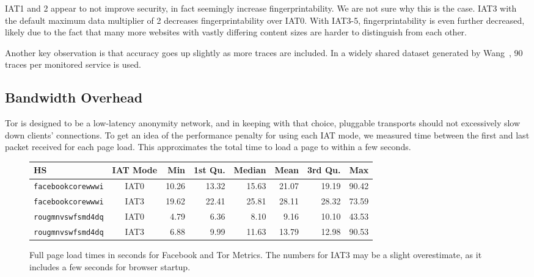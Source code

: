 \documentclass[11pt]{article}
\begin{document}
IAT1 and 2 appear to not improve security, in fact seemingly increase fingerprintability. We are not sure why this is the case. IAT3 with the default maximum data multiplier of 2 decreases fingerprintability over IAT0. With IAT3-5, fingerprintability is even further decreased, likely due to the fact that many more websites with vastly differing content sizes are harder to distinguish from each other.

Another key observation is that accuracy goes up slightly as more traces are included. In a widely shared dataset generated by Wang~\cite{wang}, 90 traces per monitored service is used.

\subsection{Bandwidth Overhead}
Tor is designed to be a low-latency anonymity network, and in keeping with that choice, pluggable transports should not excessively slow down clients' connections. To get an idea of the performance penalty for using each IAT mode, we measured time between the first and last packet received for each page load. This approximates the total time to load a page to within a few seconds.
\begin{figure}[tb]
    \centering
    \begin{tabular}{|l|c||r|r|r|r|r|r|}
        \hline
        HS & IAT Mode & Min & 1st Qu. & Median & Mean & 3rd Qu. & Max \\
        \hline
        \texttt{facebookcorewwwi} & IAT0 & 10.26 & 13.32 & 15.63 & 21.07 & 19.19 & 90.42 \\
        \texttt{facebookcorewwwi} & IAT3 & 19.62 & 22.41 & 25.81 & 28.11 & 28.32 & 73.59 \\
        \texttt{rougmnvswfsmd4dq} & IAT0 & 4.79 & 6.36 & 8.10 & 9.16 & 10.10 & 43.53 \\
        \texttt{rougmnvswfsmd4dq} & IAT3 & 6.88 & 9.99 & 11.63 & 13.79 & 12.98 & 90.53 \\
        \hline
    \end{tabular}
    \caption[]{Full page load times in seconds for Facebook and Tor Metrics. The numbers for IAT3 may be a slight overestimate, as it includes a few seconds for browser startup.}
\end{figure}
\end{document}
